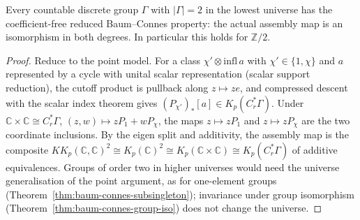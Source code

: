 \begin{theorem}\label{thm:baum-connes-order-two}
\leanok
Every countable discrete group $\Gamma$ with $|\Gamma|=2$ in the lowest universe
has the
coefficient-free reduced Baum--Connes property: the actual assembly map is an
isomorphism in both degrees. In particular this holds for $\mathbb Z/2$.
\end{theorem}
\begin{proof}
\leanok
Reduce to the point model. For a class
$\chi'\otimes\mathrm{infl}\,a$ with $\chi'\in\{1,\chi\}$ and $a$ represented by a
cycle with unital scalar representation (scalar support reduction), the cutoff
product is pullback along $z\mapsto ze$, and compressed descent with the scalar
index theorem gives $(P_{\chi'})_*[a]\in K_p(C^*_r\Gamma)$. Under
$\mathbb C\times\mathbb C\cong C^*_r\Gamma$, $(z,w)\mapsto zP_1+wP_\chi$, the maps
$z\mapsto zP_1$ and $z\mapsto zP_\chi$ are the two coordinate inclusions. By the
eigen split and additivity, the assembly map is the composite
$KK_p(\mathbb C,\mathbb C)^2\cong K_p(\mathbb C)^2\cong K_p(\mathbb C\times\mathbb C)
\cong K_p(C^*_r\Gamma)$ of additive equivalences. Groups of order two in higher
universes would need the universe generalisation of the point argument, as for
one-element groups (Theorem~\ref{thm:baum-connes-subsingleton}); invariance under
group isomorphism (Theorem~\ref{thm:baum-connes-group-iso}) does not change the
universe.
\end{proof}

